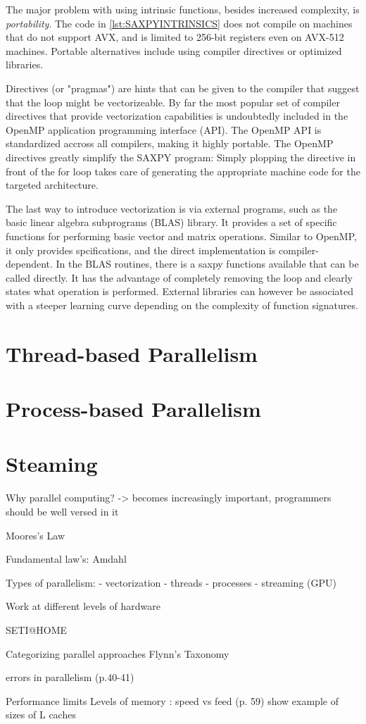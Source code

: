 The major problem with using intrinsic functions, besides increased complexity, is \emph{portability}. The code in \ref{lst:SAXPYINTRINSICS} does not compile on machines that do not support AVX, and is limited to 256-bit registers even on AVX-512 machines. Portable alternatives include using compiler directives or optimized libraries.

Directives (or "pragmas") are hints that can be given to the compiler that suggest that the loop might be vectorizeable. By far the most popular set of compiler directives that provide vectorization capabilities is undoubtedly included in the OpenMP application programming interface (API). The OpenMP API is standardized accross all compilers, making it highly portable. The OpenMP directives greatly simplify the SAXPY program:
\noindent Simply plopping the directive in front of the for loop takes care of generating the appropriate machine code for the targeted architecture. 

The last way to introduce vectorization is via external programs, such as the basic linear algebra subprograms (BLAS) library. It provides a set of specific functions for performing basic vector and matrix operations. Similar to OpenMP, it only provides spcifications, and the direct implementation is compiler-dependent. In the BLAS routines, there is a saxpy functions available that can be called directly. It has the advantage of completely removing the loop and clearly states what operation is performed.
\noindent External libraries can however be associated with a steeper learning curve depending on the complexity of function signatures.

\section{Thread-based Parallelism}

\section{Process-based Parallelism}

\section{Steaming}

Why parallel computing?
-> becomes increasingly important, programmers should be well versed in it

Moores's Law

Fundamental law's: Amdahl

Types of parallelism:
- vectorization
- threads
- processes
- streaming (GPU)

Work at different levels of hardware

SETI@HOME

Categorizing parallel approaches Flynn's Taxonomy

errors in parallelism (p.40-41)

Performance limits
Levels of memory : speed vs feed (p. 59) show example of sizes of L caches

